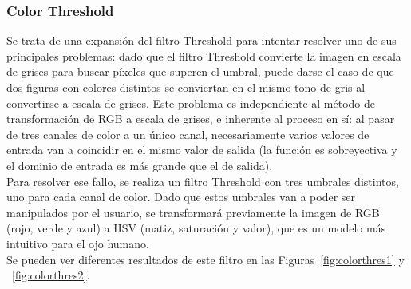 {	\subsubsection{Color Threshold}

	Se trata de una expansión del filtro Threshold para intentar resolver uno de sus principales problemas: dado que el filtro Threshold convierte la imagen en escala de grises para buscar píxeles que superen el umbral, puede darse el caso de que dos figuras con colores distintos se conviertan en el mismo tono de gris al convertirse a escala de grises. Este problema es independiente al método de transformación de RGB a escala de grises, e inherente al proceso en sí: al pasar de tres canales de color a un único canal, necesariamente varios valores de entrada van a coincidir en el mismo valor de salida (la función es sobreyectiva y el dominio de entrada es más grande que el de salida).\\
	
	Para resolver ese fallo, se realiza un filtro Threshold con tres umbrales distintos, uno para cada canal de color. Dado que estos umbrales van a poder ser manipulados por el usuario, se transformará previamente la imagen de RGB (rojo, verde y azul) a HSV (matiz, saturación y valor), que es un modelo más intuitivo para el ojo humano.\\
	
	Se pueden ver diferentes resultados de este filtro en las Figuras~\ref{fig:colorthres1} y ~\ref{fig:colorthres2}.
	
}

